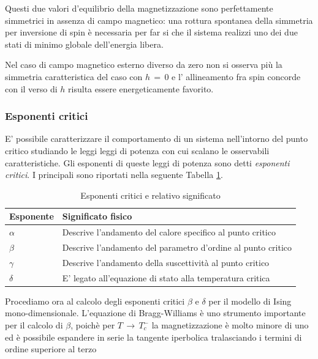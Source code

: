 Questi due valori d'equilibrio della magnetizzazione sono perfettamente simmetrici in assenza di campo magnetico: una 
rottura spontanea della simmetria per inversione di spin è necessaria per far si che il sistema realizzi uno dei due stati di 
minimo globale dell'energia libera. 

Nel caso di campo magnetico esterno diverso da zero non si osserva più la simmetria caratteristica del caso con $h\,=\,0$ e l'
allineamento fra spin concorde con il verso di $h$ risulta essere energeticamente favorito.



\subsubsection{Esponenti critici}

E' possibile caratterizzare il comportamento di un sistema nell'intorno del punto critico studiando le leggi leggi di potenza con 
cui scalano le osservabili caratteristiche. Gli esponenti di queste leggi di potenza sono detti \textit{esponenti critici}. I 
principali sono riportati nella seguente Tabella \ref{tab: crit_exp}.

\begin{table}[h!]
    \centering
    \begin{tabular}{|>{\centering\arraybackslash}p{2cm}|>{\centering\arraybackslash}p{11cm}|}
    \hline
    \textbf{Esponente} & \textbf{Significato fisico} \\ 
    \hline
    $\alpha$ & Descrive l'andamento del calore specifico al punto critico \\ 
    \hline
    $\beta$ & Descrive l'andamento del parametro d'ordine al punto critico \\ 
    \hline
    $\gamma$ & Descrive l'andamento della suscettività al punto critico \\ 
    \hline
    $\delta$ & E' legato all'equazione di stato alla temperatura critica \\ 
    \hline
    \end{tabular}
    \label{tab: crit_exp}
    \caption{Esponenti critici e relativo significato}
\end{table}

Procediamo ora al calcolo degli esponenti critici $\beta$ e $\delta$ per il modello di Ising mono-dimensionale. L'equazione di Bragg-Williams 
è uno strumento importante per il calcolo di $\beta$, poichè per $T\,\to\,T^-_c$ la magnetizzazione è molto minore di uno ed è possibile 
espandere in serie la tangente iperbolica tralasciando i termini di ordine superiore al terzo 

